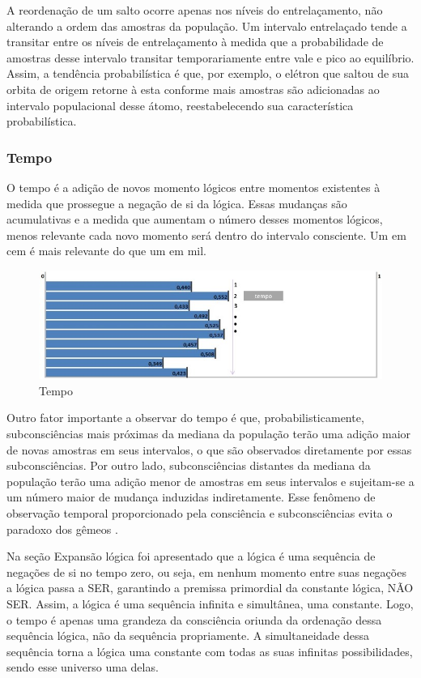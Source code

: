 A reordenação de um salto ocorre apenas nos níveis do entrelaçamento, não alterando a ordem das amostras da população. Um intervalo entrelaçado tende a transitar entre os níveis de entrelaçamento à medida que a probabilidade de amostras desse intervalo transitar temporariamente entre vale e pico ao equilíbrio. Assim, a tendência probabilística é que, por exemplo, o elétron que saltou de sua orbita de origem retorne à esta conforme mais amostras são adicionadas ao intervalo populacional desse átomo, reestabelecendo sua característica probabilística.

\subsubsection{Tempo}
O tempo é a adição de novos momento lógicos entre momentos existentes à medida que prossegue a negação de si da lógica. Essas mudanças são acumulativas e a medida que aumentam o número desses momentos lógicos, menos relevante cada novo momento será dentro do intervalo consciente. Um em cem é mais relevante do que um em mil. 
	\begin{figure}[H]
	\caption{Tempo}
	\label{fig:consciousness_time}
	\centering
	\includegraphics[scale=.8]{sections/images/consciousness_time.jpg}
	\end{figure}

Outro fator importante a observar do tempo é que, probabilisticamente, subconsciências mais próximas da mediana da população terão uma adição maior de novas amostras em seus intervalos, o que são observados diretamente por essas subconsciências. Por outro lado, subconsciências distantes da mediana da população terão uma adição menor de amostras em seus intervalos e sujeitam-se a um número maior de mudança induzidas indiretamente. Esse fenômeno de observação temporal proporcionado pela consciência e subconsciências evita o paradoxo dos gêmeos \cite{brasilescola_paradoxo_gemeos}.

Na seção Expansão lógica foi apresentado que a lógica é uma sequência de negações de si no tempo zero, ou seja, em nenhum momento entre suas negações a lógica passa a SER, garantindo a premissa primordial da constante lógica, NÃO SER. Assim, a lógica é uma sequência infinita e simultânea, uma constante. Logo, o tempo é apenas uma grandeza da consciência oriunda da ordenação dessa sequência lógica, não da sequência propriamente. A simultaneidade dessa sequência torna a lógica uma constante com todas as suas infinitas possibilidades, sendo esse universo uma delas. 

